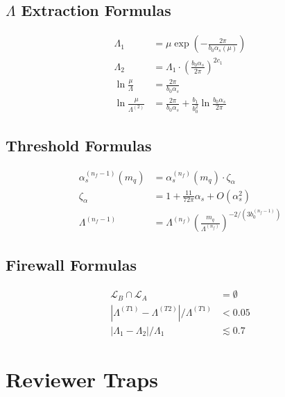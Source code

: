 \documentclass[11pt,a4paper]{article}
\theoremstyle{definition}
\begin{document}
\subsection{$\Lambda$ Extraction Formulas}
\label{subsec:cat-lambda}

\begin{align}
\label{eq:cat-18}
\Lambda_1 &= \mu\exp\left(-\frac{2\pi}{b_0\alpha_s(\mu)}\right) \\
\label{eq:cat-19}
\Lambda_2 &= \Lambda_1 \cdot \left(\frac{b_0\alpha_s}{2\pi}\right)^{2c_1} \\
\label{eq:cat-20}
\ln\frac{\mu}{\Lambda} &= \frac{2\pi}{b_0\alpha_s} \\
\label{eq:cat-21}
\ln\frac{\mu}{\Lambda^{(2)}} &= \frac{2\pi}{b_0\alpha_s} + \frac{b_1}{b_0^2}\ln\frac{b_0\alpha_s}{2\pi}
\end{align}

\subsection{Threshold Formulas}
\label{subsec:cat-threshold}

\begin{align}
\label{eq:cat-22}
\alpha_s^{(n_f-1)}(m_q) &= \alpha_s^{(n_f)}(m_q) \cdot \zeta_\alpha \\
\label{eq:cat-23}
\zeta_\alpha &= 1 + \frac{11}{72\pi}\alpha_s + O(\alpha_s^2) \\
\label{eq:cat-24}
\Lambda^{(n_f-1)} &= \Lambda^{(n_f)}\left(\frac{m_q}{\Lambda^{(n_f)}}\right)^{-2/(3b_0^{(n_f-1)})}
\end{align}

\subsection{Firewall Formulas}
\label{subsec:cat-firewall}

\begin{align}
\label{eq:cat-25}
\mathcal{L}_B \cap \mathcal{L}_A &= \emptyset \\
\label{eq:cat-26}
|\Lambda^{(T1)} - \Lambda^{(T2)}|/\Lambda^{(T1)} &< 0.05 \\
\label{eq:cat-27}
|\Lambda_1 - \Lambda_2|/\Lambda_1 &\lesssim 0.7
\end{align}

\section{Reviewer Traps}
\label{sec:traps}
\end{document}
